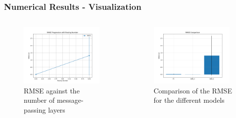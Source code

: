 \documentclass{beamer}
\begin{document}
\begin{frame}
    \frametitle{Numerical Results - Visualization}
    \begin{columns}
        \begin{figure}
            \centering
            \includegraphics[width=0.95\textwidth]{Images/metrics_plots/2k/rmse_line_plot.png}
            \caption{RMSE against the number of message-passing layers}
            \end{figure}
        \begin{figure}
            \centering
            \includegraphics[width=0.95\textwidth]{Images/metrics_plots/2k/rmse_histogram.png}
            \caption{Comparison of the RMSE for the different models}
        \end{figure}
    \end{columns}
\end{frame}
\end{document}
